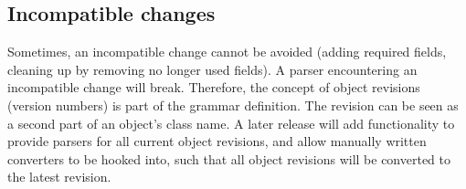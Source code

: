 \documentclass[11pt,a4paper,oneside]{article}
\begin{document}
\subsection{Incompatible changes}
Sometimes, an incompatible change cannot be avoided (adding required fields,
cleaning up by removing no longer used fields). A parser encountering an
incompatible change will break. Therefore, the concept of object revisions
(version numbers) is part of the grammar definition. The revision can be seen as
a second part of an object's class name. A later release will add functionality
to provide parsers for all current object revisions, and allow manually written
converters to be hooked into, such that all object revisions will be converted
to the latest revision.
\end{document}

